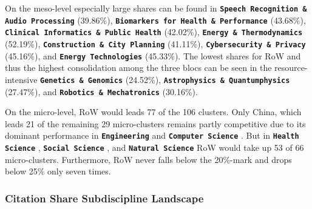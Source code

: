 \documentclass{article}
\begin{document}
	On the meso-level especially large shares can be found in \textbf{\texttt{Speech Recognition \& Audio Processing}}  (39.86\%), \textbf{\texttt{Biomarkers for Health \& Performance}}  (43.68\%), \textbf{\texttt{Clinical Informatics \& Public Health}}  (42.02\%), \textbf{\texttt{Energy \& Thermodynamics}}  (52.19\%), \textbf{\texttt{Construction \& City Planning}}  (41.11\%), \textbf{\texttt{Cybersecurity \& Privacy}}  (45.16\%), and \textbf{\texttt{Energy Technologies}}  (45.33\%). The lowest shares for RoW and thus the highest consolidation among the three blocs can be seen in the resource-intensive \textbf{\texttt{Genetics \& Genomics}}  (24.52\%), \textbf{\texttt{Astrophysics \& Quantumphysics}}  (27.47\%), and \textbf{\texttt{Robotics \& Mechatronics}}  (30.16\%).
	
	On the micro-level, RoW would leads 77 of the 106 clusters. Only China, which leads 21 of the remaining 29 micro-clusters remains partly competitive due to its dominant performance in \textbf{\texttt{Engineering}}  and \textbf{\texttt{Computer Science}} . But in \textbf{\texttt{Health Science}} , \textbf{\texttt{Social Science}} , and \textbf{\texttt{Natural Science}}  RoW would take up 53 of 66 micro-clusters. Furthermore, RoW never falls below the 20\%-mark and drops below 25\% only seven times. 
	
	
	
	
	
	\subsubsection{Citation Share Subdiscipline Landscape}
	
\end{document}
